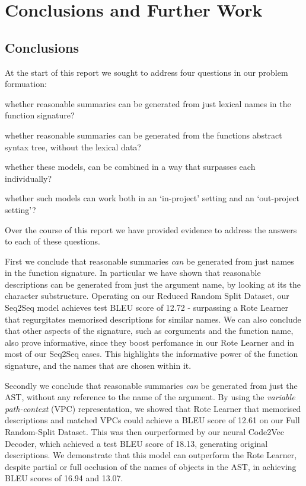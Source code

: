 \chapter{Conclusions and Further Work}
\label{chapterlabel4}


\section{Conclusions}

At the start of this report we sought to address four questions in our problem formuation:

\begin{tight_enumerate}
    \item whether reasonable summaries can be generated from just lexical names in the function signature?
    \item whether reasonable summaries can be generated from the functions abstract syntax tree, without the lexical data?
    \item whether these models, can be combined in a way that surpasses each individually?
    \item whether such models can work both in an `in-project' setting and an `out-project setting'?
\end{tight_enumerate}

Over the course of this report we have provided evidence to address the answers to each of these questions. 

First we conclude that reasonable summaries \textit{can} be generated from just names in the function signature. 
In particular we have shown that reasonable descriptions can be generated from just the argument name, by looking at its the character substructure. Operating on our Reduced Random Split Dataset, our Seq2Seq model achieves test BLEU score of 12.72 - surpassing a Rote Learner that regurgitates memorised descriptions for similar names.  
We can also conclude that other aspects of the signature, such as corguments and the function name, also prove informative, since they boost perfomance in our Rote Learner and in most of our Seq2Seq cases. 
This highlights the informative power of the function signature, and the names that are chosen within it.

Secondly we conclude that reasonable summaries \textit{can} be generated from just the AST, without any reference to the name of the argument. 
By using the \textit{variable path-context} (VPC) representation, we showed that Rote Learner that memorised descriptions and matched VPCs could achieve a BLEU score of 12.61 on our Full Random-Split Dataset. This was then ourperformed by our neural Code2Vec Decoder, which achieved a test BLEU score of 18.13, generating original descriptions. 
We demonstrate that this model can outperform the Rote Learner, despite partial or full occlusion of the names of objects in the AST, in achieving BLEU scores of 16.94 and 13.07.


